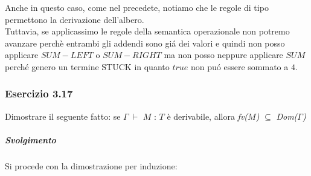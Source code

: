 Anche in questo caso, come nel precedete, notiamo che le regole di tipo permettono la derivazione dell'albero.\\
Tuttavia, se applicassimo le regole della semantica operazionale non potremo avanzare perch\`e entrambi gli addendi sono gi\'a dei valori e quindi non posso applicare $SUM-LEFT$ o $SUM-RIGHT$ ma non posso neppure applicare $SUM$ perch\'e genero un termine STUCK in quanto $true$ non pu\'o essere sommato a $4$.

\subsubsection*{Esercizio 3.17}

Dimostrare il seguente fatto: se $\Gamma\:\vdash$ $M$ : $T$ \`e derivabile, allora  \textit{fv($M$)}  $\subseteq$ \textit{Dom($\Gamma$)}
\subparagraph*{Svolgimento}

Si procede con la dimostrazione per induzione:

